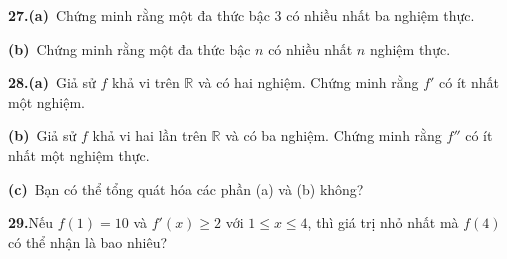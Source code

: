 \begin{minipage}[t]{0.485\textwidth}
  \textbf{27.}\enspace \textbf{(a)}~Chứng minh rằng một đa thức bậc 3 có nhiều nhất ba nghiệm thực.\par
  \textbf{(b)}~Chứng minh rằng một đa thức bậc $n$ có nhiều nhất $n$ nghiệm thực.

  \textbf{28.}\enspace \textbf{(a)}~Giả sử $f$ khả vi trên $\mathbb{R}$ và có hai nghiệm. Chứng minh rằng $f'$ có ít nhất một nghiệm.\par
  \textbf{(b)}~Giả sử $f$ khả vi hai lần trên $\mathbb{R}$ và có ba nghiệm. Chứng minh rằng $f''$ có ít nhất một nghiệm thực.\par
  \textbf{(c)}~Bạn có thể tổng quát hóa các phần (a) và (b) không?

  \textbf{29.}\enspace Nếu $f(1) = 10$ và $f'(x) \ge 2$ với $1 \le x \le 4$, thì giá trị nhỏ nhất mà $f(4)$ có thể nhận là bao nhiêu?
\end{minipage}%
\hfill
